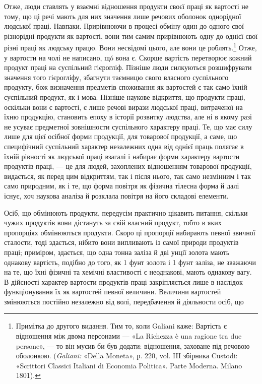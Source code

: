 Отже, люди ставлять у взаємні відношення продукти своєї
праці як вартості не тому, що ці речі мають для них значення лише
речових оболонок однорідної людської праці. Навпаки. Прирівнюючи
в процесі обміну один до одного свої різнорідні продукти
як вартості, вони тим самим прирівнюють одну до однієї свої
різні праці як людську працю. Вони несвідомі цього, але вони
це роблять.\footnote{
Примітка до другого видання. Тим то, коли Galiani каже: Вартість
є відношення між двома персонами — «La Richezza è una ragione
tra due persone», — то він мусив би був додати: відношення, заховане під
речовою оболонкою. (\emph{Galiani:} «Della Moneta», р. 220, vol. III збірника
Custodi: «Scrittori Classici Italiani di Economia Politica». Parte
Moderna. Milano 1801).
} Отже, у вартости на чолі не написано, щó вона є.
Скорше вартість перетворює кожний продукт праці на суспільний
гієрогліф. Пізніше люди силкуються розшифрувати значення того
гієрогліфу, збагнути таємницю свого власного суспільного продукту,
бож визначення предметів споживання як вартостей є
так само їхній суспільний продукт, як і мова. Пізніше наукове
відкриття, що продукти праці, оскільки вони є вартості, є лише
речові вирази людської праці, витраченої на їхню продукцію,
становить епоху в історії розвитку людства, але ні в якому разі
не усуває предметної зовнішности суспільного характеру праці.
Те, що має силу лише для цієї осібної форми продукції, для товарової
продукції, а саме, що специфічний суспільний характер
незалежних одна від однієї праць полягає в їхній рівності як
людської праці взагалі і набирає форми характеру вартости продуктів
праці, — це для людей, захоплених відношенням товарової
продукції, видається, як перед цим відкриттям, так і після нього,
так само незмінним і так само природним, як і те, що форма повітря
як фізична тілесна форма й далі існує, хоч наукова аналіза
й розклала повітря на його складові елементи.

Осіб, що обмінюють продукти, передусім практично цікавить
питання, скільки чужих продуктів вони дістануть за свій власний
продукт, тобто в яких пропорціях обмінюються продукти. Скоро
ці пропорції набирають певної звичної сталости, тоді здається,
нібито вони випливають із самої природи продуктів праці; приміром,
здається, що одна тонна заліза й дві унції золота мають однакову
вартість, подібно до того, як 1 фунт золота і 1 фунт заліза, не
зважаючи на те, що їхні фізичні та хемічні властивості є неоднакові,
мають однакову вагу. В дійсності характер вартости продуктів
праці закріпляється лише в наслідок функціонування їх як
вартостей певної величини. Величини вартостей змінюються постійно
незалежно від волі, передбачення й діяльности осіб, що
\parbreak{}  %
